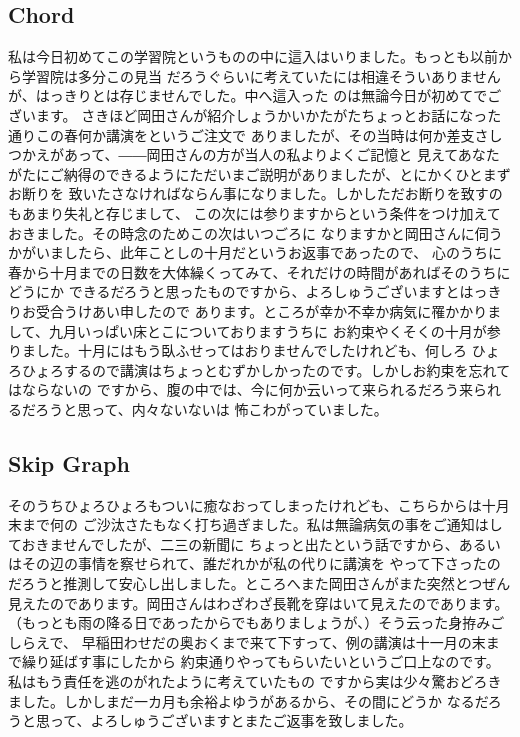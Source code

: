\subsection{Chord}
私は今日初めてこの学習院というものの中に這入はいりました。もっとも以前から学習院は多分この見当
だろうぐらいに考えていたには相違そういありませんが、はっきりとは存じませんでした。中へ這入った
のは無論今日が初めてでございます。
さきほど岡田さんが紹介しょうかいかたがたちょっとお話になった通りこの春何か講演をというご注文で
ありましたが、その当時は何か差支さしつかえがあって、――岡田さんの方が当人の私よりよくご記憶と
見えてあなたがたにご納得のできるようにただいまご説明がありましたが、とにかくひとまずお断りを
致いたさなければならん事になりました。しかしただお断りを致すのもあまり失礼と存じまして、
この次には参りますからという条件をつけ加えておきました。その時念のためこの次はいつごろに
なりますかと岡田さんに伺うかがいましたら、此年ことしの十月だというお返事であったので、
心のうちに春から十月までの日数を大体繰くってみて、それだけの時間があればそのうちにどうにか
できるだろうと思ったものですから、よろしゅうございますとはっきりお受合うけあい申したので
あります。ところが幸か不幸か病気に罹かかりまして、九月いっぱい床とこについておりますうちに
お約束やくそくの十月が参りました。十月にはもう臥ふせってはおりませんでしたけれども、何しろ
ひょろひょろするので講演はちょっとむずかしかったのです。しかしお約束を忘れてはならないの
ですから、腹の中では、今に何か云いって来られるだろう来られるだろうと思って、内々ないないは
怖こわがっていました。

\subsection{Skip Graph}
そのうちひょろひょろもついに癒なおってしまったけれども、こちらからは十月末まで何の
ご沙汰さたもなく打ち過ぎました。私は無論病気の事をご通知はしておきませんでしたが、二三の新聞に
ちょっと出たという話ですから、あるいはその辺の事情を察せられて、誰だれかが私の代りに講演を
やって下さったのだろうと推測して安心し出しました。ところへまた岡田さんがまた突然とつぜん
見えたのであります。岡田さんはわざわざ長靴を穿はいて見えたのであります。
（もっとも雨の降る日であったからでもありましょうが、）そう云った身拵みごしらえで、
早稲田わせだの奥おくまで来て下すって、例の講演は十一月の末まで繰り延ばす事にしたから
約束通りやってもらいたいというご口上なのです。私はもう責任を逃のがれたように考えていたもの
ですから実は少々驚おどろきました。しかしまだ一カ月も余裕よゆうがあるから、その間にどうか
なるだろうと思って、よろしゅうございますとまたご返事を致しました。


